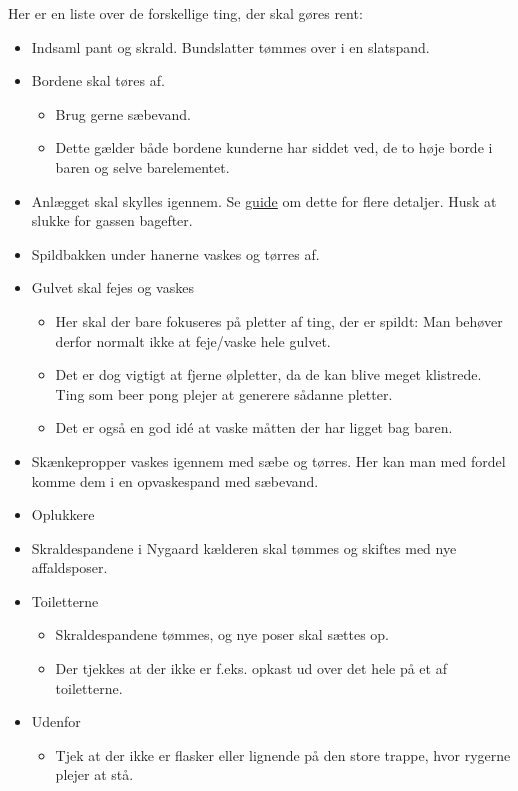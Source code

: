 Her er en liste over de forskellige ting, der skal gøres rent:
\begin{itemize}
	\item Indsaml pant og skrald. Bundslatter tømmes over i en slatspand.
	\item Bordene skal tøres af.
	\begin{itemize}
		\item Brug gerne sæbevand.
		\item Dette gælder både bordene kunderne har siddet ved, de to høje
			borde i baren og selve barelementet.
	\end{itemize}
	\item Anlægget skal skylles igennem. Se \href{https://media.fredagscafeen.dk/guides/rensningafanlaeg.pdf}{guide} om dette for flere
	detaljer. Husk at slukke for gassen bagefter.
	\item Spildbakken under hanerne vaskes og tørres af.
	\item Gulvet skal fejes og vaskes
	\begin{itemize}
		\item Her skal der bare fokuseres på pletter af ting, der er spildt:
			Man behøver derfor normalt ikke at feje/vaske hele gulvet.
		\item Det er dog vigtigt at fjerne ølpletter, da de kan blive meget
			klistrede. Ting som beer pong plejer at generere sådanne pletter.
		\item Det er også en god idé at vaske måtten der har ligget bag baren.
	\end{itemize}
	\item Skænkepropper vaskes igennem med sæbe og tørres. Her kan man med fordel komme dem i en opvaskespand med sæbevand.
	\item Oplukkere
	\item Skraldespandene i Nygaard kælderen skal tømmes og skiftes med nye affaldsposer.
	\item Toiletterne
	\begin{itemize}
		\item Skraldespandene tømmes, og nye poser skal sættes op.
		\item Der tjekkes at der ikke er f.eks. opkast ud over det hele på
			et af toiletterne.
	\end{itemize}
	\item Udenfor
	\begin{itemize}
		\item Tjek at der ikke er flasker eller lignende på den store trappe,
			hvor rygerne plejer at stå.
	\end{itemize}
\end{itemize}
